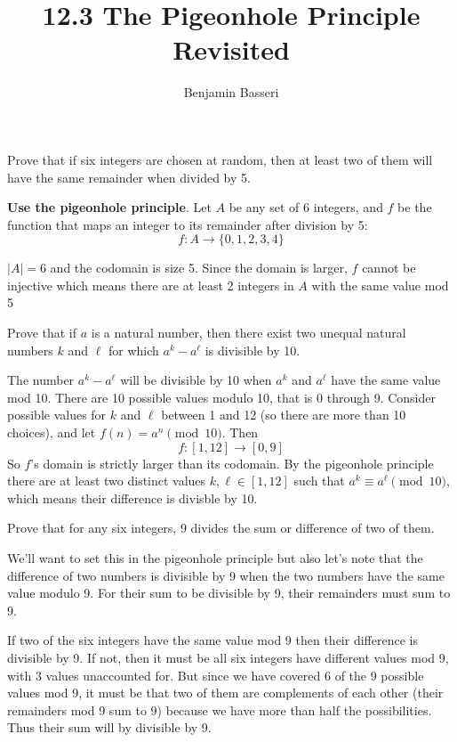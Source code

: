 \documentclass{article}
\title{12.3 The Pigeonhole Principle Revisited}
\author{Benjamin Basseri}
\begin{document}
\maketitle

\begin{problem}
Prove that if six integers are chosen at random, then at least two of them will have the same remainder when divided by 5.
\end{problem}

\textbf{Use the pigeonhole principle}. Let $A$ be any set of 6 integers, and $f$ be the function that maps an integer to its remainder after division by 5:
$$f: A \to \{0, 1, 2, 3, 4\}$$

$|A| = 6$ and the codomain is size 5. Since the domain is larger, $f$ cannot be injective which means there are at least 2 integers in $A$ with the same value mod 5

\begin{problem}
Prove that if $a$ is a natural number, then there exist two unequal natural numbers $k$ and $\ell$ for which $a^k - a^\ell$ is divisible by 10.
\end{problem}

The number $a^k - a^\ell$ will be divisible by 10 when $a^k$ and $a^\ell$ have the same value mod 10. There are 10 possible values modulo 10, that is 0 through 9. Consider possible values for $k$ and $\ell$ between 1 and 12 (so there are more than 10 choices), and let $f(n) = a^n \pmod{10}$. Then
$$f: [1, 12] \to [0, 9]$$
So $f$'s domain is strictly larger than its codomain. By the pigeonhole principle there are at least two distinct values $k, \ell \in [1, 12]$ such that $a^k \equiv a^\ell \pmod{10}$, which means their difference is divisble by 10.

\begin{problem}
Prove that for any six integers, 9 divides the sum or difference of two of them.
\end{problem}

We'll want to set this in the pigeonhole principle but also let's note that the difference of two numbers is divisible by 9 when the two numbers have the same value modulo 9. For their sum to be divisible by 9, their remainders must sum to 9.

If two of the six integers have the same value mod 9 then their difference is divisible by 9. If not, then it must be all six integers have different values mod 9, with 3 values unaccounted for. But since we have covered 6 of the 9 possible values mod 9, it must be that two of them are complements of each other (their remainders mod 9 sum to 9) because we have more than half the possibilities. Thus their sum will by divisible by 9.
\end{document}
